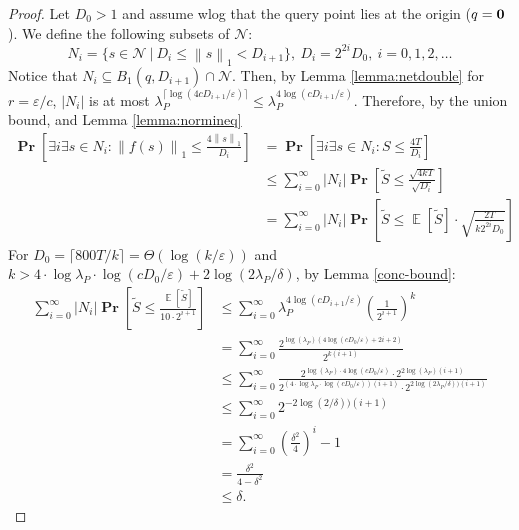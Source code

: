 \documentclass[10pt,a4paper,twoside]{book}
\newcommand{\mbf}[1]{\mbox{\boldmath$\rm{#1}$}}
\newcommand{\eps}{\varepsilon}
\newcommand{\net}{\mathcal{N}}
\newcommand{\norm}[1]{\left \rVert {#1} \right \rVert}
\DeclareMathOperator*{\prob}{\mathbf{Pr}}
\DeclareMathOperator*{\EE}{\mathbb{E}}
\theoremstyle{definition}
\theoremstyle{remark}
\begin{document}
\begin{proof}
Let $D_0>1$ and assume wlog that the query point lies at the origin ($q = \mbf{0}$). We define the following subsets of $\net$:
\begin{equation*}
    N_i = \{ s \in \mathcal{N} \ | \ D_i \leq \norm{s}_1 < D_{i+1} \}, \ D_i = 2^{2i} D_0, \ i = 0, 1, 2, \ldots
\end{equation*}
Notice that $N_i \subseteq B_1(q, D_{i+1}) \cap \net$. Then, by Lemma \ref{lemma:netdouble} for $r= \eps/c$, $|N_i|$ is at most $\lambda_P^{\lceil \log \left(4cD_{i+1} / \eps \right) \rceil} \leq \lambda_P^{4 \log \left(cD_{i+1} / \eps \right)}$. Therefore, by the union bound, and Lemma \ref{lemma:normineq}
\begin{align*}
    \prob \left[ \exists i \exists s \in N_i : \norm{f(s)}_{1} \leq \frac{4\norm{s}_{1}}{D_i}  \right] &= \prob \left[ \exists i \exists s \in N_i : S \leq \frac{4T}{D_i}  \right]\\
    &\leq \sum_{i=0}^{\infty} |N_i| \prob \left[\tilde{S} \leq \frac{\sqrt{4kT}}{\sqrt{D_i}} \right] \\
    &= \sum_{i=0}^{\infty} |N_i| \prob \left[\tilde{S} \leq \EE[\tilde{S}] \cdot \sqrt{\frac{2T}{k 2^{2i} D_0}} \right]
\end{align*}
For $D_0 =\lceil 800T/k \rceil = \Theta(\log (k/\eps))$ and $k > 4 \cdot \log{\lambda_P} \cdot \log(c D_0/ \eps)+2 \log (2 \lambda_P/\delta) $, by Lemma \ref{conc-bound}:
\begin{align*}
    \sum_{i=0}^{\infty} |N_i| \prob \left[\tilde{S} \leq \frac{\EE[\tilde{S}]}{10 \cdot 2^{i+1}} \right] &\leq \sum_{i=0}^{\infty} \lambda_P^{4 \log{(cD_{i+1}/ \eps)}} \left( \frac{1}{2^{i+1}}\right)^k \\
    &= \sum_{i=0}^{\infty} \frac{ 2^{\log(\lambda_P)({4 \log{(cD_0/ \eps)}+2i+2})}}{ 2^{k(i+1)}} \\
    &\leq \sum_{i=0}^{\infty} \frac{ 2^{\log(\lambda_P) \cdot 4 \log{(cD_0/ \eps)}} \cdot 2^{2\log(\lambda_P) (i+1)}}{ 2^{(4 \cdot \log{\lambda_P} \cdot \log(c D_0/ \eps))(i+1)} \cdot 2^{2 \log (2 \lambda_P/\delta))(i+1)}} \\
    &\leq \sum_{i=0}^{\infty} { 2^{-2 \log (2/\delta))(i+1)} } \\
    &= \sum_{i=0}^{\infty} \left( \frac{\delta^2}{4} \right)^{i} - 1 \\
    &= \frac{\delta^2}{4 - \delta^2} \\
    &\leq \delta.
\end{align*}


\end{proof}
\end{document}
